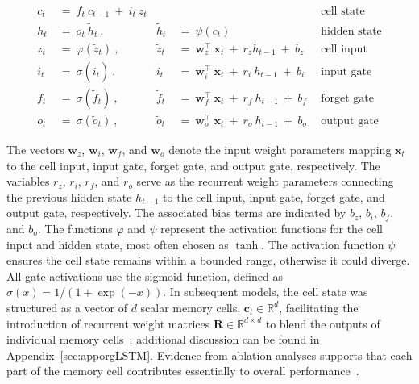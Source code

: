 \begin{align}
c_t \ &= \  f_t \ c_{t-1} \ + \ i_t \ z_t &  & &\text{cell state} \\
h_t  \ &= \ o_t \ \tilde{h}_t \ , & \tilde{h}_t \ &= \ \psi \left( c_t\right)
  &\text{hidden state} \\
z_t \ &= \ \varphi \left( \tilde{z}_t \right) \ , 
  &\tilde{z}_t \ &=  \ \mathbf{w}^\top_{z} \ \mathbf{x}_t \ + \
  r_{z}  h_{t-1} \ + \  b_{z} \ \
  &\text{cell input} \\
i_t \ &= \ \sigma \left( \tilde{i}_t  \right) \ , 
  &\tilde{i}_t \ &= \ \mathbf{w}^\top_{i} \ \mathbf{x}_t \ + \
  r_{i}  \ h_{t-1} \ + \  b_{i} \ \
  &\text{input gate} \\
f_t \ &= \ \sigma \left(  \tilde{f}_t \right) \ , 
  &\tilde{f}_t \ &= \ \mathbf{w}^\top_{f} \ \mathbf{x}_t  \ + \
  r_{f}  \ h_{t-1} \ + \  b_{f} \ \
  &\text{forget gate} \\
o_t \ &= \ \sigma \left( \tilde{o}_t \right) \ , 
  &\tilde{o}_t  \ &= \ \mathbf{w}^\top_{o} \ \mathbf{x}_t \ + \
  r_{o}  \ h_{t-1} \ + \  b_{o} \ \
  &\text{output gate} 
\end{align}

The vectors $\mathbf{w}_{z}$, $\mathbf{w}_{i}$, $\mathbf{w}_{f}$, and $\mathbf{w}_{o}$ denote the input weight parameters mapping $\mathbf{x}_t$ to the cell input, input gate, forget gate, and output gate, respectively. The variables $r_{z}$, $r_{i}$, $r_{f}$, and $r_{o}$ serve as the recurrent weight parameters connecting the previous hidden state $h_{t-1}$ to the cell input, input gate, forget gate, and output gate, respectively. The associated bias terms are indicated by $b_{z}$, $b_{i}$, $b_{f}$, and $b_{o}$. The functions $\varphi$ and $\psi$ represent the activation functions for the cell input and hidden state, most often chosen as $\tanh$. The activation function $\psi$ ensures the cell state remains within a bounded range, otherwise it could diverge. All gate activations use the sigmoid function, defined as $\sigma \left( x \right)= 1/(1+\exp(-x))$. In subsequent models, the cell state was structured as a vector of $d$ scalar memory cells, $\mathbf{c}_t \in \mathbb{R}^{d}$, facilitating the introduction of recurrent weight matrices $\mathbf{R} \in \mathbb{R}^{d \times d}$ to blend the outputs of individual memory cells~\citep{Greff:15}; additional discussion can be found in Appendix~\ref{sec:apporgLSTM}. Evidence from ablation analyses supports that each part of the memory cell contributes essentially to overall performance~\citep{Greff:15}.

